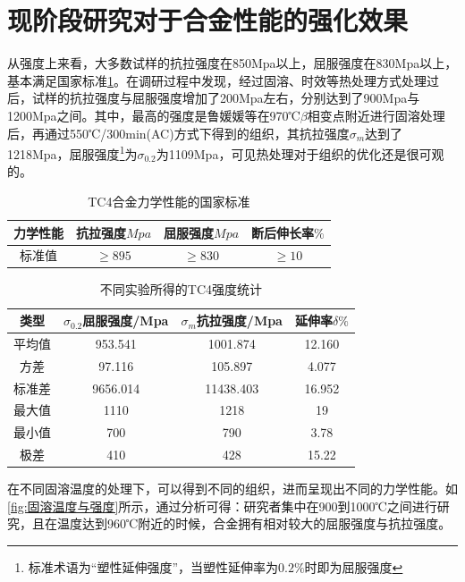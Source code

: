 \documentclass[
class = book,
zihao = -4,
font = noto,
paper = a4paper,
openany
]{easybook}
\begin{document}
\section{现阶段研究对于合金性能的强化效果}
从强度上来看，大多数试样的抗拉强度在850Mpa以上，屈服强度在830Mpa以上，基本满足国家标准\ref{sec:mytc4machin}。在调研过程中发现，经过固溶、时效等热处理方式处理过后，试样的抗拉强度与屈服强度增加了200Mpa左右，分别达到了900Mpa与1200Mpa之间。其中，最高的强度是鲁媛媛等\cite{LuYuanYuanShiXiaoChuLiDuiTC4TaiHeJinWeiGuanZuZhiHeLiXueXingNengDeYingXiang2019}在970℃$ \beta $相变点附近进行固溶处理后，再通过550℃/300min(AC)方式下得到的组织，其抗拉强度$ \sigma_m $达到了1218Mpa，屈服强度\footnote{标准术语为“塑性延伸强度”，当塑性延伸率为$0.2\%  $时即为屈服强度}为$ \sigma_{0.2} $为1109Mpa，可见热处理对于组织的优化还是很可观的。
\begin{table}[htbp]
	\centering
	\caption{TC4合金力学性能的国家标准}
	\label{sec:mytc4machin}
	\begin{tabular}{cccc}
		\toprule
		力学性能& 抗拉强度$Mpa  $& 屈服强度$ Mpa $&断后伸长率$ \% $\\ \midrule
		标准值 &$ \ge 895 $&$ \ge 830 $&$ \ge 10 $ \\ \bottomrule
	\end{tabular}
\end{table}


\begin{table}[htbp]
	\centering
	\caption{不同实验所得的TC4强度统计}
	\label{sec:mytcstrengthave}
	\begin{tabular}{cccc}
		\toprule
		类型& $ \sigma_{0.2} $屈服强度/Mpa  &$ \sigma_m $抗拉强度/Mpa &延伸率$ \delta \% $ \\ \midrule
		平均值 & 953.541& 1001.874&12.160 \\
		方差 &97.116& 105.897& 4.077 \\
		标准差 &9656.014&11438.403&16.952 \\
		最大值 &  1110 & 1218 & 19 \\
		最小值&700 & 790 & 3.78 \\
		极差&410 & 428 & 15.22 \\
		\bottomrule
	\end{tabular}
\end{table}




在不同固溶温度的处理下，可以得到不同的组织，进而呈现出不同的力学性能。如\ref{fig:固溶温度与强度}所示，通过分析可得：研究者集中在900到1000℃之间进行研究，且在温度达到960℃附近的时候，合金拥有相对较大的屈服强度与抗拉强度。
\end{document}

